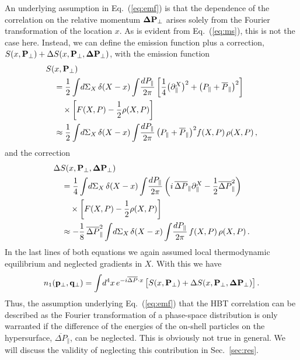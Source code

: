 \documentclass[reprint,superscriptaddress,english,preprintnumbers,amsmath,amssymb,aps,prx]{revtex4-2}
\def\Eq#1{Eq.~(\ref{#1})}
\def\Sec#1{Sec.~\ref{#1}}
\begin{document}
An underlying assumption in \Eq{eq:emf} is that the dependence of the correlation on the relative momentum $\bold{\Delta P}_\perp$ arises solely from the Fourier transformation of the location $x$. As is evident from \Eq{eq:ms}, this is not the case here. Instead, we can define the emission function plus a correction, $S(x,\bold{P}_\perp)+\Delta S(x,\bold{P}_\perp,\bold{\Delta P}_\perp)$, with the emission function
\begin{align}\label{eq:em}
\begin{split}
&S(x,\bold{P}_\perp)\\
&\quad= \frac{1}{2}\int\!d\Sigma_X\, \delta(X-x) \int\! \frac{dP_\parallel}{2\pi}\,
\bigg[ 
\frac{1}{4} \big(\partial^{X}_\parallel\big)^2+\big( P_\parallel + \overline{P}_\parallel \big)^2\bigg]\\
&\quad\quad\times\bigg[ F(X,P) - \frac{1}{2}\rho(X,P) \bigg]\\
&\quad\approx
\frac{1}{2}\int\!d\Sigma_X\, \delta(X-x) \int\! \frac{dP_\parallel}{2\pi}\,
\big( P_\parallel + \overline{P}_\parallel \big)^2 f(X,P)\,\rho(X,P)\,,
\end{split}
\end{align}
and the correction
\begin{align}\label{eq:dem}
\begin{split}
&\Delta S(x,\bold{P}_\perp,\bold{\Delta P}_\perp)\\
&\quad= \frac{1}{4}\int\!d\Sigma_X\, \delta(X-x) \int\! \frac{dP_\parallel}{2\pi}\,
\bigg(i\,\overline{\Delta P}_\parallel \partial^{X}_\parallel
- \frac{1}{2} \overline{\Delta P}_\parallel^2
 \bigg)\\
&\quad\quad\times\bigg[ F(X,P) - \frac{1}{2}\rho(X,P) \bigg]\\
&\quad\approx
-\frac{1}{8}\, \overline{\Delta P}_\parallel^2\int\!d\Sigma_X\, \delta(X-x) \int\! \frac{dP_\parallel}{2\pi}\,
f(X,P)\,\rho(X,P)\,.
\end{split}
\end{align}
In the last lines of both equations we again assumed local thermodynamic equilibrium and neglected gradients in $X$. With this we have
\begin{align}\label{eq:emf2}
n_1(\bold{p}_\perp,\bold{q}_\perp) = \int\! d^4x\,e^{-i \overline{\Delta P}\cdot x}\, \big[S(x,\bold{P}_\perp)+\Delta S(x,\bold{P}_\perp,\bold{\Delta P}_\perp)\big]\,.
\end{align}
Thus, the assumption underlying \Eq{eq:emf} that the HBT correlation can be described as the Fourier transformation of a phase-space distribution is only warranted if the difference of the energies of the on-shell particles on the hypersurface, $\overline{\Delta P}_\parallel$, can be neglected.
This is obviously not true in general. We will discuss the validity of neglecting this contribution in \Sec{sec:res}.
\end{document}
